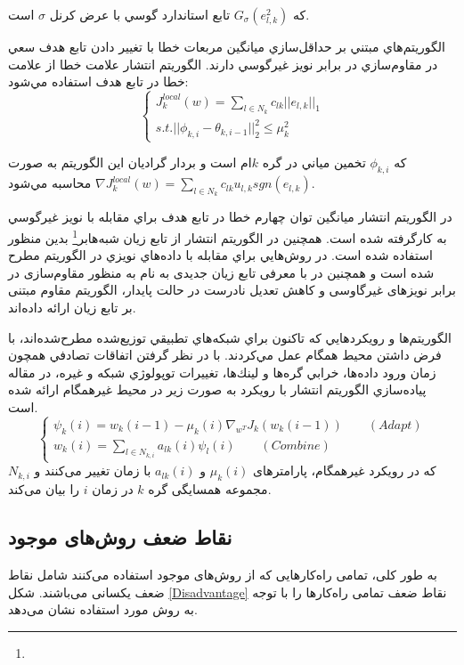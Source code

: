 كه $G_{\sigma}(e^2_{l,k})$ تابع استاندارد گوسي با عرض كرنل $\sigma$ است.

الگوريتم‌هاي مبتني بر حداقل‌سازي ميانگين مربعات خطا با تغيير دادن تابع هدف سعي در مقاوم‌سازي در برابر نويز غيرگوسي دارند. الگوريتم انتشار علامت خطا  \cite{Ni2016} از علامت خطا در تابع هدف استفاده مي‌شود:
\begin{equation}\label{e144}
	\begin{cases}
		J_k^{local}(w)=\sum_{l\in N_k}c_{lk} \lvert\lvert e_{l,k}\rvert\rvert_1\\
		s.t. \lvert\lvert \phi_{k,i}-\theta_{k,i-1}\rvert\rvert^2_2\le\mu_k^2
	\end{cases}
\end{equation}

كه $\phi_{k,i}$ تخمين مياني در گره‌ $k$ام است و بردار گراديان اين الگوريتم به صورت $\nabla J_k^{local}(w)=\sum_{l\in N_k}c_{lk}u_{l,k}sgn(e_{l,k})$ محاسبه مي‌شود. 

در الگوريتم انتشار   \cite{Park2014} ميانگين توان چهارم خطا در تابع هدف براي مقابله با نويز غيرگوسي به كارگرفته شده است. همچنين در الگوريتم انتشار  \cite{Ashk} از تابع زيان شبه‌هابر\footnote{} بدين منظور استفاده شده است. در \cite{Bert2011} روش‌هايي براي مقابله با داده‌هاي نويزي در الگوريتم  مطرح شده است و همچنین در \cite{Naeimi2024_GMBZ} با معرفی تابع زیان جدیدی به نام  به منظور مقاوم‌سازی در برابر نویزهای غیرگاوسی و کاهش تعدیل نادرست در حالت پایدار، الگوریتم مقاوم  مبتنی بر تابع زیان  ارائه داده‌اند. 

الگوريتم‌ها و رويكرد‌هايي كه تاكنون براي شبكه‌هاي تطبيقي توزيع‌شده مطرح‌شده‌‌اند، با فرض داشتن محیط همگام عمل مي‌كردند. با در نظر گرفتن اتفاقات تصادفي همچون زمان ورود داده‌ها، خرابي گره‌ها و لينك‌ها، تغييرات توپولوژي شبكه و غیره، در مقاله \cite{Zhao2014} پياده‌سازي الگوريتم انتشار با رويكرد  به صورت زير در محيط غیرهمگام ارائه شده است.
\begin{equation}\label{e145}
	\begin{cases}
		\psi_k(i)=w_k(i-1)-\mu_k(i) \nabla_{w^T}J_k({w_k(i-1)})\qquad(Adapt)\\
		w_k(i)=\sum_{l\in N_{k,i}}a_{lk}(i)\psi_l(i)\qquad(Combine)
	\end{cases}
\end{equation}
كه در رويكرد غیرهمگام، پارامترهای $\mu_k(i)$ و $a_{lk} (i)$ با زمان تغییر می‌کنند و $N_{k,i}$ مجموعه همسایگی گره $k$ در زمان $i$ را بیان می‌کند. 

\subsection{نقاط ضعف روش‌های موجود}
به طور کلی، تمامی راه‌کارهایی که از روش‌های موجود استفاده می‌کنند شامل نقاط ضعف یکسانی می‌باشند. شکل \ref{Disadvantage} نقاط ضعف تمامی راه‌کار‌ها را با توجه به روش مورد استفاده نشان می‌دهد. 
 
